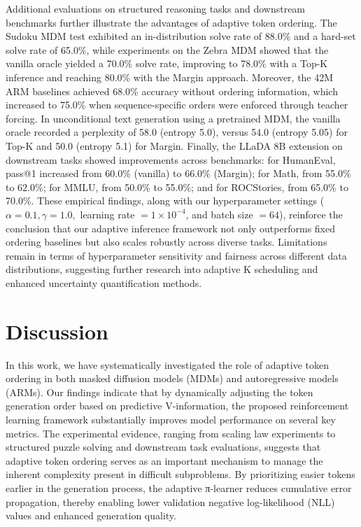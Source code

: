 \documentclass{article}
\begin{document}
Additional evaluations on structured reasoning tasks and downstream benchmarks further illustrate the advantages of adaptive token ordering. The Sudoku MDM test exhibited an in-distribution solve rate of 88.0\% and a hard-set solve rate of 65.0\%, while experiments on the Zebra MDM showed that the vanilla oracle yielded a 70.0\% solve rate, improving to 78.0\% with a Top-K inference and reaching 80.0\% with the Margin approach. Moreover, the 42M ARM baselines achieved 68.0\% accuracy without ordering information, which increased to 75.0\% when sequence-specific orders were enforced through teacher forcing. In unconditional text generation using a pretrained MDM, the vanilla oracle recorded a perplexity of 58.0 (entropy 5.0), versus 54.0 (entropy 5.05) for Top-K and 50.0 (entropy 5.1) for Margin. Finally, the LLaDA 8B extension on downstream tasks showed improvements across benchmarks: for HumanEval, pass@1 increased from 60.0\% (vanilla) to 66.0\% (Margin); for Math, from 55.0\% to 62.0\%; for MMLU, from 50.0\% to 55.0\%; and for ROCStories, from 65.0\% to 70.0\%. These empirical findings, along with our hyperparameter settings (\( \alpha = 0.1, \gamma = 1.0, \) learning rate \( = 1\times10^{-4} \), and batch size \( = 64 \)), reinforce the conclusion that our adaptive inference framework not only outperforms fixed ordering baselines but also scales robustly across diverse tasks. Limitations remain in terms of hyperparameter sensitivity and fairness across different data distributions, suggesting further research into adaptive K scheduling and enhanced uncertainty quantification methods.

\section{Discussion}
In this work, we have systematically investigated the role of adaptive token ordering in both masked diffusion models (MDMs) and autoregressive models (ARMs). Our findings indicate that by dynamically adjusting the token generation order based on predictive V-information, the proposed reinforcement learning framework substantially improves model performance on several key metrics. The experimental evidence, ranging from scaling law experiments to structured puzzle solving and downstream task evaluations, suggests that adaptive token ordering serves as an important mechanism to manage the inherent complexity present in difficult subproblems. By prioritizing easier tokens earlier in the generation process, the adaptive π-learner reduces cumulative error propagation, thereby enabling lower validation negative log-likelihood (NLL) values and enhanced generation quality.
\end{document}
